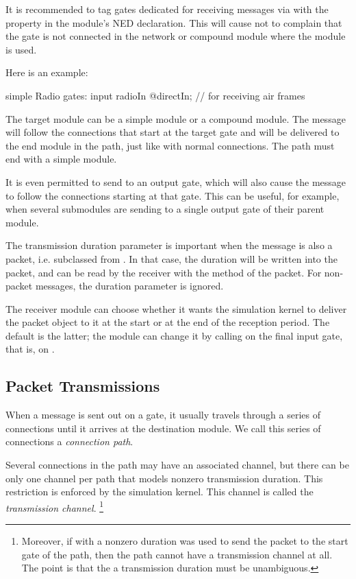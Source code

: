 It is recommended to tag gates dedicated for receiving messages via
 with the  property in the module's NED
declaration. This will cause {\opp} not to complain that the gate is not
connected in the network or compound module where the module is used.

Here is an example:

\begin{ned}
simple Radio {
    gates:
        input radioIn @directIn;  // for receiving air frames
}
\end{ned}

The target module can be a simple module or a compound module. The message will
follow the connections that start at the target gate and will be delivered to
the end module in the path, just like with normal connections. The path must
end with a simple module.

It is even permitted to send to an output gate, which will also cause the
message to follow the connections starting at that gate. This can be useful, for
example, when several submodules are sending to a single output gate of their
parent module.

The transmission duration parameter is important when the message is also a
packet, i.e. subclassed from . In that case, the duration
will be written into the packet, and can be read by the receiver with the
 method of the packet. For non-packet messages, the
duration parameter is ignored.

The receiver module can choose whether it wants the simulation kernel
to deliver the packet object to it at the start or at the end of the
reception period. The default is the latter; the module can change it by calling
 on the final input gate, that is, on
.


\subsection{Packet Transmissions}
\label{sec:simple-modules:packet-transmission}

When a message is sent out on a gate, it usually travels through
a series of connections until it arrives at the destination module.
We call this series of connections a \textit{connection path}.

Several connections in the path may have an associated channel,
but there can be only one channel per path that models nonzero
transmission duration. This restriction is enforced by the simulation
kernel. This channel is called the \textit{transmission channel}.
  \footnote{Moreover, if  with a nonzero duration
  was used to send the packet to the start gate of the path,
  then the path cannot have a transmission channel at all.
  The point is that the a transmission duration must be unambiguous.}

